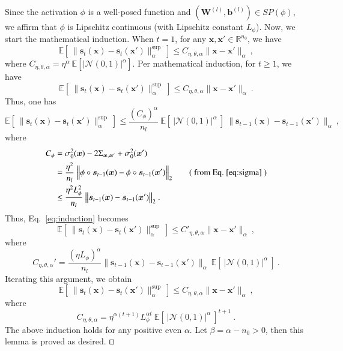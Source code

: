\documentclass[review,10pt]{JMtemplate}
\begin{document}
Since the activation $\phi$ is a well-posed function and $(\mathbf{W}^{(l)},\boldsymbol{b}^{(l)}) \in SP(\phi)$, we affirm that $\phi$ is Lipschitz continuous (with Lipschitz constant $L_{\phi}$). Now, we start the mathematical induction. When $t=1$, for any $\boldsymbol{x}, \boldsymbol{x}' \in \mathbb{R}^{n_0}$, we have
\[
\mathbb{E} \left[~ \| \boldsymbol{s}_t(\boldsymbol{x}) - \boldsymbol{s}_t(\boldsymbol{x}') \|_{\alpha}^{\textrm{sup}} ~\right] \leq C_{\eta,\theta,\alpha} \| \boldsymbol{x} - \boldsymbol{x}' \|_{\alpha} \ ,
\]
where $C_{\eta,\theta,\alpha} = \eta^{\alpha}~ \mathbb{E}[ |\mathcal{N}(0,1)|^{\alpha} ] $. Per mathematical induction, for $t \geq 1$, we have
\[
\mathbb{E} \left[~ \| \boldsymbol{s}_t(\boldsymbol{x}) - \boldsymbol{s}_t(\boldsymbol{x}') \|_{\alpha}^{\textrm{sup}} ~\right] \leq C_{\eta,\theta,\alpha} \| \boldsymbol{x} - \boldsymbol{x}' \|_{\alpha} \ .
\]
Thus, one has
\begin{equation} \label{eq:induction}
\mathbb{E} \left[~ \| \boldsymbol{s}_t(\boldsymbol{x}) - \boldsymbol{s}_t(\boldsymbol{x}') \|_{\alpha}^{\textrm{sup}} ~\right] 
\leq \frac{ (C_{\phi})^{\alpha} }{n_l} ~\mathbb{E}[~ |\mathcal{N}(0,1)|^{\alpha} ~]~ \Big\| \boldsymbol{s}_{t-1}(\boldsymbol{x}) - \boldsymbol{s}_{t-1}(\boldsymbol{x}') \Big\|_{\alpha}  \ ,
\end{equation}
where
\[
\begin{aligned}
C_{\phi} &= \sigma^2_0(\boldsymbol{x}) - 2 \Sigma_{\boldsymbol{x},\boldsymbol{x}'} + \sigma^2_0(\boldsymbol{x}') \\
&=  \frac{\eta^2}{n_l}~  \Big\| \phi\circ \boldsymbol{s}_{t-1}(\boldsymbol{x}) - \phi\circ \boldsymbol{s}_{t-1}(\boldsymbol{x}') \Big\|_2  \qquad\text{(~from Eq.~\eqref{eq:sigma}~)} \\
&\leq \frac{\eta^2 L_{\phi}^2}{n_l}~ \big\| \boldsymbol{s}_{t-1}(\boldsymbol{x}) - \boldsymbol{s}_{t-1}(\boldsymbol{x}') \big\|_2 \ .
\end{aligned}
\]
Thus, Eq.~\eqref{eq:induction} becomes
\[
\mathbb{E} \left[~ \| \boldsymbol{s}_t(\boldsymbol{x}) - \boldsymbol{s}_t(\boldsymbol{x}') \|_{\alpha}^{\textrm{sup}} ~\right]
\leq C'_{\eta,\theta,\alpha} \| \boldsymbol{x} - \boldsymbol{x}' \|_{\alpha} \ ,
\]
where
\[
C_{\eta,\theta,\alpha}' = \frac{(\eta L_{\phi})^{\alpha}}{n_l} \big\| \boldsymbol{s}_{t-1}(\boldsymbol{x}) - \boldsymbol{s}_{t-1}(\boldsymbol{x}') \big\|_{\alpha}~ \mathbb{E}[~ |\mathcal{N}(0,1)|^{\alpha} ~] \ .
\]
Iterating this argument, we obtain
\[
\mathbb{E} \left[~ \| \boldsymbol{s}_t(\boldsymbol{x}) - \boldsymbol{s}_t(\boldsymbol{x}') \|_{\alpha}^{\textrm{sup}} ~\right]  \leq C_{\eta,\theta,\alpha} \| \boldsymbol{x} - \boldsymbol{x}' \|_{\alpha} \ ,
\]
where 
\[
C_{\eta,\theta,\alpha} = \eta^{\alpha (t+1)} L_{\phi}^{\alpha t} ~ \mathbb{E}[~ |\mathcal{N}(0,1)|^{\alpha} ~]^{t+1} \ .
\]
The above induction holds for any positive even $\alpha$. Let $\beta = \alpha - n_0 > 0$, then this lemma is proved as desired. $\hfill\square$
	
\end{document}

